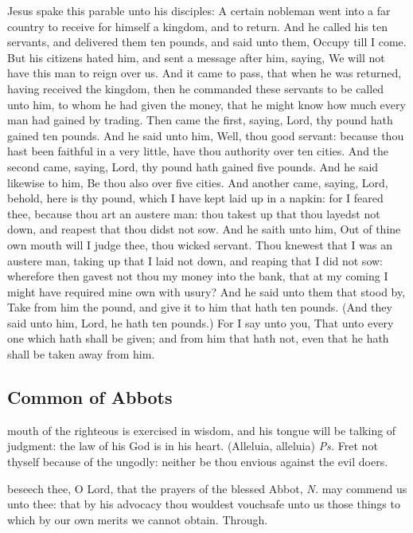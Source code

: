 \label{Luke1912}
 Jesus spake this parable unto his disciples: A certain nobleman went into a far country to receive for himself a kingdom, and to return. And he called his ten servants, and delivered them ten pounds, and said unto them, Occupy till I come. But his citizens hated him, and sent a message after him, saying, We will not have this man to reign over us. And it came to pass, that when he was returned, having received the kingdom, then he commanded these servants to be called unto him, to whom he had given the money, that he might know how much every man had gained by trading. Then came the first, saying, Lord, thy pound hath gained ten pounds. And he said unto him, Well, thou good servant: because thou hast been faithful in a very little, have thou authority over ten cities. And the second came, saying, Lord, thy pound hath gained five pounds. And he said likewise to him, Be thou also over five cities. And another came, saying, Lord, behold, here is thy pound, which I have kept laid up in a napkin: for I feared thee, because thou art an austere man: thou takest up that thou layedst not down, and reapest that thou didst not sow. And he saith unto him, Out of thine own mouth will I judge thee, thou wicked servant. Thou knewest that I was an austere man, taking up that I laid not down, and reaping that I did not sow: wherefore then gavest not thou my money into the bank, that at my coming I might have required mine own with usury? And he said unto them that stood by, Take from him the pound, and give it to him that hath ten pounds. (And they said unto him, Lord, he hath ten pounds.) For I say unto you, That unto every one which hath shall be given; and from him that hath not, even that he hath shall be taken away from him.


\subsection{Common of Abbots}\label{CommonAbbots}

\introit
{} mouth of the righteous is exercised in wisdom, and his tongue will be talking of judgment: the law of his God is in his heart. (Alleluia, alleluia) \textit{Ps.} Fret not thyself because of the ungodly: neither be thou envious against the evil doers.

\collect\label{CommonAbbotsCollect}
 beseech thee, O Lord, that the prayers of the blessed Abbot, \textit{N.} may commend us unto thee: that by his advocacy thou wouldest vouchsafe unto us those things to which by our own merits we cannot obtain. Through.

